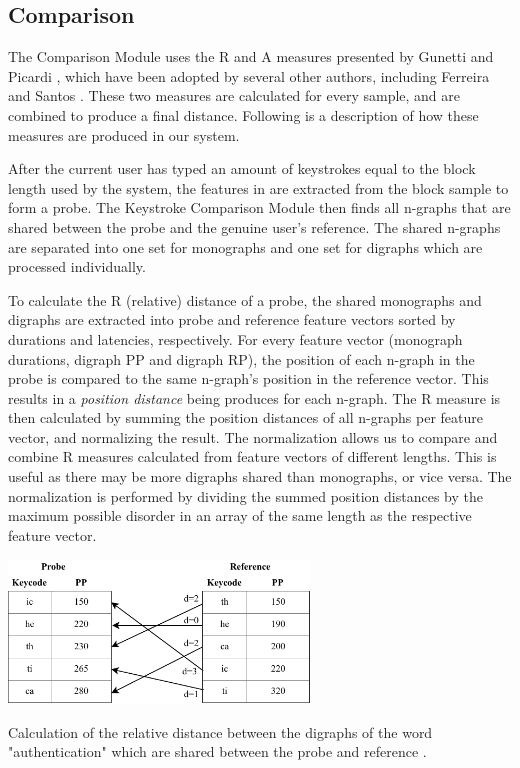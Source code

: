 \subsection{Comparison}
The Comparison Module uses the R and A measures presented by Gunetti and Picardi \cite{gnp}, which have been adopted by several other authors, including Ferreira and Santos \cite{superResults}.
These two measures are calculated for every sample, and are combined to produce a final distance.
Following is a description of how these measures are produced in our system.

After the current user has typed an amount of keystrokes equal to the block length used by the system, the features in  are extracted from the block sample to form a probe.
The Keystroke Comparison Module then finds all n-graphs that are shared between the probe and the genuine user's reference.
The shared n-graphs are separated into one set for monographs and one set for digraphs which are processed individually.

To calculate the R (relative) distance of a probe, the shared monographs and digraphs are extracted into probe and reference feature vectors sorted by durations and latencies, respectively.
For every feature vector (monograph durations, digraph PP and digraph RP), the position of each n-graph in the probe is compared to the same n-graph's position in the reference vector.
This results in a \textit{position distance} being produces for each n-graph.
The R measure is then calculated by summing the position distances of all n-graphs per feature vector, and normalizing the result.
The normalization allows us to compare and combine R measures calculated from feature vectors of different lengths. This is useful as there may be more digraphs shared than monographs, or vice versa.
The normalization is performed by dividing the summed position distances by the maximum possible disorder in an array of the same length as the respective feature vector.

\begin{table}[h]
\centering
    \includegraphics[width=0.6\textwidth]{figures/R-measure.pdf}
    \caption{Calculation of the relative distance between the digraphs of the word "authentication" which are shared between the probe and reference \cite{gnp}.}
    \label{fig:R-measure}
\end{table}

